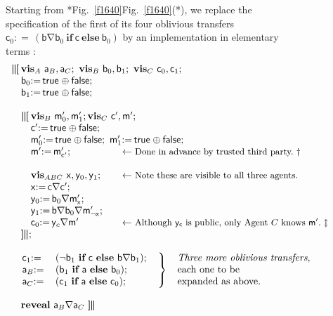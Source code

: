 \documentclass[runningheads]{llncs}
\newcommand\Va {\mathsf{a}}
\newcommand\Vb {\mathsf{b}}
\newcommand\Vc {\mathsf{c}}
\newcommand\Vx {\mathsf{x}}
\newcommand\Vy {\mathsf{y}}
\newcommand\Vm {\mathsf{m}}
\newcommand\Gets {{:}{=}\,}
\newcommand\If {\textbf{if}}
\newcommand\Else {\textbf{else}}
\newcommand\Reveal {\textbf{reveal}}
\newcommand\PC[1] {\mathbin{_{#1}\oplus}} \newcommand\UC[1] {\mathbin{_{#1}\uplus}} \newcommand{\ITE}[3]{#1\,\IF\,#2\,\ELSE\,#3}
\newcommand\True {\textsf{true}}
\newcommand\False {\textsf{false}}
\newcommand\Xor {\mathbin{\nabla}}
\newcommand\Vis {\textbf{vis}}
\newcommand{\Begin}{\mbox{\boldmath\textbf{$\parallel\kern-.365em[$}}}
\newcommand{\End}{\mbox{\boldmath\textbf{$]\kern-.365em\parallel$}}}
\newcommand\InQuadL[1] {\makebox[0pt][l]{$#1$}\quad}
\newcommand\IF {\textbf{if}}
\newcommand\ELSE {\textbf{else}}
\newenvironment{Figure}[2][t]{\begin{figure}[#1]\def\Label{#2}\small}{\label{\Label}\end{figure}}
\newcommand\Fig[2][*] {{\def\z{#1}\if*\z Fig.~\ref{#2}\else Fig.~\ref{#2}(#1)\fi}}
\begin{document}
\begin{Figure}[ht!]{f1641}
Starting from \Fig{f1640}, we replace the specification of the first of its four oblivious transfers $\Vc_0\Gets (\Vb{\Xor}\Vb_0~\If~\Vc~\Else~\Vb_0)$ by an implementation in elementary terms \cite{McIver:09b}:
\[
 \begin{array}{ll} 
  \multicolumn{2}{l}{\InQuadL{\Begin} \Vis_{A}~\Va_{B}, \Va_{C};~ \Vis_{B}~\Vb_{0},\Vb_{1};~ \Vis_{C}~\Vc_{0}, \Vc_{1};} \\
  \quad \Vb_0\Gets\True\PC{}\False; \\
  \quad \Vb_1\Gets\True\PC{}\False; \\\\

  \multicolumn{2}{l}{\quad\InQuadL{\Begin} \Vis_B~ \Vm'_0,\Vm'_1; \Vis_C~\Vc',\Vm';} \\
  \quad\quad \Vc'\Gets\True\PC{}\False; \\
  \multicolumn{2}{l}{\quad\quad \Vm'_0\Gets\True\PC{}\False;~\Vm'_1\Gets\True\PC{}\False;} \\
  \quad\quad \Vm'\Gets \Vm'_{\Vc'}; 
    & \hspace{1em}\textrm{$\leftarrow$\small\ Done in advance by trusted third party.~$\dagger$} \\\\
   \quad\quad \Vis_{ABC}~\Vx,\Vy_0,\Vy_1;
    & \hspace{1em}\textrm{$\leftarrow$\small\ Note these are visible to all three agents.} \\
   \quad\quad \Vx\Gets \Vc{\Xor}\Vc'; \\
   \quad\quad \Vy_0\Gets \Vb_0{\Xor}\Vm'_{\Vx}; \\
   \quad\quad \Vy_1\Gets \Vb{\Xor}\Vb_0{\Xor}\Vm'_{\neg \Vx}; \\
   \quad\quad \Vc_{0}\Gets \Vy_c{\Xor} \Vm' 
   & \hspace{1em}\textrm{$\leftarrow$\small\ Although $\Vy_{\Vc}$ is public, only Agent $C$ knows $\Vm'$.~$\ddagger$} \\
  \quad\End; \\\\
  \multicolumn{2}{l}{
  \quad\left.\begin{array}{@{}ll}
              \Vc_1\Gets& (\neg \Vb_1~\If~\Vc~\Else~\Vb{\Xor}\Vb_1); \\
              \Va_B\Gets& (\Vb_1~\If~\Va~\Else~\Vb_0); \\
              \Va_C\Gets& (\Vc_1~\If~\Va~\Else~\Vc_0);
             \end{array}
             ~~\right\}~{\begin{tabular}{l}\textit{Three more oblivious transfers}, \\ each one to be \\ expanded as above.\end{tabular}}}
   \\\\
  \quad \Reveal~\Va_{B}{\Xor}\Va_{C}~\End
 \end{array}
\]



\end{Figure}
\end{document}
